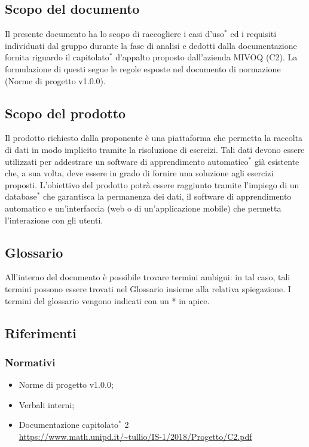 \subsection{Scopo del documento}
	Il presente documento ha lo scopo di raccogliere i casi d'uso$^*$ ed i requisiti individuati dal gruppo durante la fase di analisi e dedotti dalla documentazione fornita riguardo il capitolato$^*$ d'appalto proposto dall'azienda MIVOQ (C2). La formulazione di questi segue le regole esposte nel documento di normazione (Norme di progetto v1.0.0).

\subsection{Scopo del prodotto}
	Il prodotto richiesto dalla proponente è una piattaforma che permetta la raccolta di dati in modo implicito tramite la risoluzione di esercizi. Tali dati devono essere utilizzati per addestrare un software di apprendimento automatico$^*$ già esistente che, a sua volta, deve essere in grado di fornire una soluzione agli esercizi proposti. L'obiettivo del prodotto potrà essere raggiunto tramite l'impiego di un database$^*$ che garantisca la permanenza dei dati, il software di apprendimento automatico e un'interfaccia (web o di un'applicazione mobile) che permetta l'interazione con gli utenti.

\subsection{Glossario}
	All'interno del documento è possibile trovare termini ambigui: in tal caso, tali termini possono essere trovati nel Glossario insieme alla relativa spiegazione. I termini del glossario vengono indicati con un * in apice.
	
\subsection{Riferimenti}
	\subsubsection{Normativi}
	\begin{itemize}
		\item Norme di progetto v1.0.0;
		\item Verbali interni;
		\item Documentazione capitolato$^*$ 2 \\
		\url {https://www.math.unipd.it/~tullio/IS-1/2018/Progetto/C2.pdf}
	\end{itemize}

